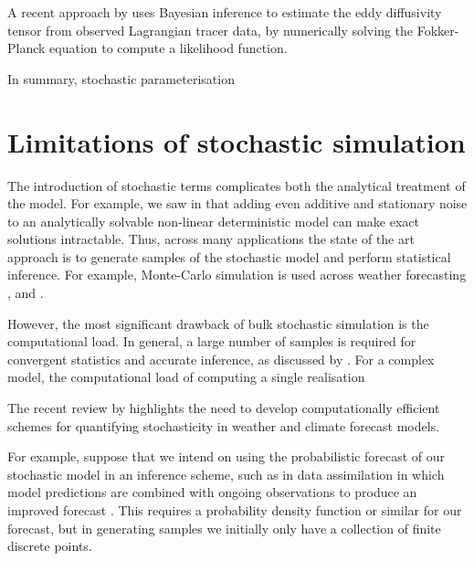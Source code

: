 A recent approach by \cite{YingEtAl_2019_BayesianInferenceOcean} uses Bayesian inference to estimate the eddy diffusivity tensor from observed Lagrangian tracer data, by numerically solving the Fokker-Planck equation to compute a likelihood function.


In summary, stochastic parameterisation



\section{Limitations of stochastic simulation}
The introduction of stochastic terms complicates both the analytical treatment of the model.
For example, we saw in  that adding even additive and  stationary noise to an analytically solvable non-linear deterministic model can make exact solutions intractable.
Thus, across many applications the state of the art approach is to generate samples of the stochastic model and perform statistical inference.
For example, Monte-Carlo simulation is used across weather forecasting \citep{LeutbecherEtAl_2017_StochasticRepresentationsModel},  and .

However, the most significant drawback of bulk stochastic simulation is the computational load.
In general, a large number of samples is required for convergent statistics and accurate inference, as discussed by \citet{Leutbecher_2019_EnsembleSizeHow}.
For a complex model, the computational load of computing a single realisation

The recent review by \citet{LeutbecherEtAl_2017_StochasticRepresentationsModel} highlights the need to develop computationally efficient schemes for quantifying stochasticity in weather and climate forecast models.


For example, suppose that we intend on using the probabilistic forecast of our stochastic model in an inference scheme, such as in data assimilation in which model predictions are combined with ongoing observations to produce an improved forecast \cite[e.g.]{LawEtAl_2015_DataAssimilationMathematical,BudhirajaEtAl_2019_AssimilatingDataModels, ReichCotter_2015_ProbabilisticForecastingBayesian}.
This requires a probability density function or similar for our forecast, but in generating samples we initially only have a collection of finite discrete points.


